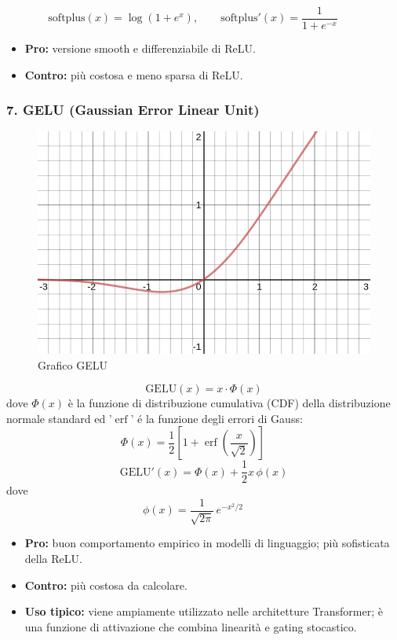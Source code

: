 \documentclass[a4paper,12pt]{report}
\begin{document}
	\[
	\mathrm{softplus}(x)=\log(1+e^x),\qquad
	\mathrm{softplus}'(x)=\frac{1}{1+e^{-x}}\qquad
	\]
	\begin{itemize}
		\item \textbf{Pro:} versione smooth e differenziabile di ReLU.
		\item \textbf{Contro:} più costosa e meno sparsa di ReLU.
	\end{itemize}
	
	\subsubsection{7. GELU (Gaussian Error Linear Unit)}
	
	\begin{figure}[H]
		\centering
		\includegraphics[width=1.0\textwidth]{img/gelu.png}
		\caption{Grafico GELU}
	\end{figure}
	
	\[
	\mathrm{GELU}(x) = x \cdot \Phi(x)
	\]
	dove \(\Phi(x)\) è la funzione di distribuzione cumulativa (CDF) della distribuzione normale standard ed '$\operatorname{erf}$' é la funzione degli errori di Gauss:
	\[
	\Phi(x) = \frac{1}{2} \left[ 1 + \operatorname{erf} \left( \frac{x}{\sqrt{2}} \right) \right] \qquad
	\]
	\[
	\mathrm{GELU}'(x) = \Phi(x) + \frac{1}{2}x\,\phi(x)
	\]
	dove
	\[
	\phi(x) = \frac{1}{\sqrt{2\pi}}\,e^{-x^{2}/2} \qquad
	\]
	\begin{itemize}
		\item \textbf{Pro:} buon comportamento empirico in modelli di linguaggio; più sofisticata della ReLU.
		\item \textbf{Contro:} più costosa da calcolare.
		\item \textbf{Uso tipico:} viene ampiamente utilizzato nelle architetture Transformer; è una funzione di attivazione  che combina linearità e gating stocastico.
	\end{itemize}
	
\end{document}
